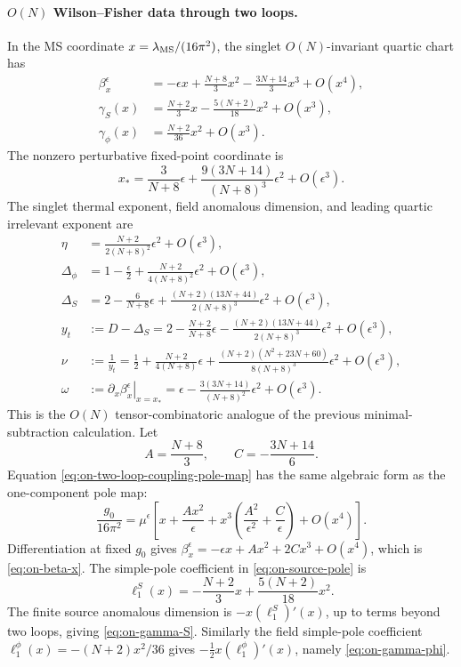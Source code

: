 \paragraph{\(O(N)\) Wilson--Fisher data through two loops.}
In the MS coordinate \(x=\lambda_{\rm MS}/(16\pi^2)\), the singlet
\(O(N)\)-invariant quartic chart has
\begin{align}
  \beta_x^\epsilon
  &=
  -\epsilon x
  +\frac{N+8}{3}x^2
  -\frac{3N+14}{3}x^3
  +O(x^4),
  \label{eq:on-beta-x}
  \\
  \gamma_S(x)
  &=
  \frac{N+2}{3}x
  -\frac{5(N+2)}{18}x^2
  +O(x^3),
  \label{eq:on-gamma-S}
  \\
  \gamma_\phi(x)
  &=
  \frac{N+2}{36}x^2
  +O(x^3).
  \label{eq:on-gamma-phi}
\end{align}
The nonzero perturbative fixed-point coordinate is
\begin{equation}
  x_*
  =
  \frac{3}{N+8}\epsilon
  +\frac{9(3N+14)}{(N+8)^3}\epsilon^2
  +O(\epsilon^3).
  \label{eq:on-x-star}
\end{equation}
The singlet thermal exponent, field anomalous dimension, and leading quartic
irrelevant exponent are
\begin{align}
  \eta
  &=
  \frac{N+2}{2(N+8)^2}\epsilon^2
  +O(\epsilon^3),
  \label{eq:on-eta}
  \\
  \Delta_\phi
  &=
  1-\frac{\epsilon}{2}
  +\frac{N+2}{4(N+8)^2}\epsilon^2
  +O(\epsilon^3),
  \label{eq:on-delta-phi}
  \\
  \Delta_S
  &=
  2-\frac{6}{N+8}\epsilon
  +\frac{(N+2)(13N+44)}{2(N+8)^3}\epsilon^2
  +O(\epsilon^3),
  \label{eq:on-delta-S}
  \\
  y_t
  &:=
  D-\Delta_S
  =
  2-\frac{N+2}{N+8}\epsilon
  -\frac{(N+2)(13N+44)}{2(N+8)^3}\epsilon^2
  +O(\epsilon^3),
  \label{eq:on-y-t}
  \\
  \nu
  &:=
  \frac1{y_t}
  =
  \frac12
  +\frac{N+2}{4(N+8)}\epsilon
  +\frac{(N+2)(N^2+23N+60)}{8(N+8)^3}\epsilon^2
  +O(\epsilon^3),
  \label{eq:on-nu}
  \\
  \omega
  &:=
  \left.\partial_x\beta_x^\epsilon\right|_{x=x_*}
  =
  \epsilon
  -\frac{3(3N+14)}{(N+8)^2}\epsilon^2
  +O(\epsilon^3).
  \label{eq:on-omega}
\end{align}
This is the \(O(N)\) tensor-combinatoric analogue of the previous
minimal-subtraction calculation.  Let
\[
  A=\frac{N+8}{3},
  \qquad
  C=-\frac{3N+14}{6}.
\]
Equation \eqref{eq:on-two-loop-coupling-pole-map} has the same algebraic form
as the one-component pole map:
\[
  \frac{g_0}{16\pi^2}
  =
  \mu^\epsilon
  \left[
    x+\frac{A x^2}{\epsilon}
    +x^3\left(\frac{A^2}{\epsilon^2}
      +\frac{C}{\epsilon}\right)
    +O(x^4)
  \right].
\]
Differentiation at fixed \(g_0\) gives
\(\beta_x^\epsilon=-\epsilon x+Ax^2+2Cx^3+O(x^4)\), which is
\eqref{eq:on-beta-x}.  The simple-pole coefficient in
\eqref{eq:on-source-pole} is
\[
  \ell_1^S(x)
  =
  -\frac{N+2}{3}x
  +\frac{5(N+2)}{18}x^2 .
\]
The finite source anomalous dimension is \(-x(\ell_1^S)'(x)\), up to
terms beyond two loops, giving \eqref{eq:on-gamma-S}.  Similarly the field
simple-pole coefficient
\(\ell_1^\phi(x)=-(N+2)x^2/36\) gives
\(-\frac12x(\ell_1^\phi)'(x)\), namely \eqref{eq:on-gamma-phi}.

